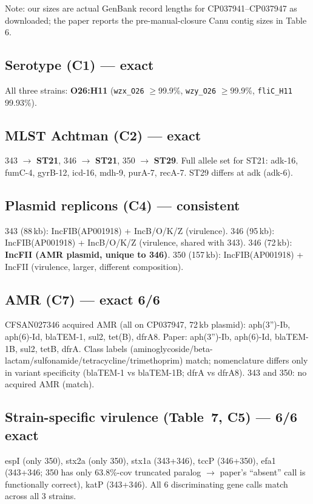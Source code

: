\documentclass[11pt,letterpaper]{article}
\begin{document}
Note: our sizes are actual GenBank record lengths for CP037941--CP037947 as
downloaded; the paper reports the pre-manual-closure Canu contig sizes in Table 6.

\subsection{Serotype (C1) --- exact}
All three strains: \textbf{O26:H11} (\texttt{wzx\_O26} $\geq$99.9\%, \texttt{wzy\_O26}
$\geq$99.9\%, \texttt{fliC\_H11} 99.93\%).

\subsection{MLST Achtman (C2) --- exact}
343 $\to$ \textbf{ST21}, 346 $\to$ \textbf{ST21}, 350 $\to$ \textbf{ST29}.
Full allele set for ST21: adk-16, fumC-4, gyrB-12, icd-16, mdh-9, purA-7, recA-7.
ST29 differs at adk (adk-6).

\subsection{Plasmid replicons (C4) --- consistent}
343 (88\,kb): IncFIB(AP001918) + IncB/O/K/Z (virulence). 346 (95\,kb):
IncFIB(AP001918) + IncB/O/K/Z (virulence, shared with 343). 346 (72\,kb):
\textbf{IncFII (AMR plasmid, unique to 346)}. 350 (157\,kb): IncFIB(AP001918) +
IncFII (virulence, larger, different composition).

\subsection{AMR (C7) --- exact 6/6}
CFSAN027346 acquired AMR (all on CP037947, 72\,kb plasmid): aph(3'')-Ib, aph(6)-Id,
blaTEM-1, sul2, tet(B), dfrA8. Paper: aph(3'')-Ib, aph(6)-Id, blaTEM-1B, sul2, tetB,
dfrA. Class labels (aminoglycoside/beta-lactam/sulfonamide/tetracycline/trimethoprim)
match; nomenclature differs only in variant specificity (blaTEM-1 vs blaTEM-1B; dfrA vs
dfrA8). 343 and 350: no acquired AMR (match).

\subsection{Strain-specific virulence (Table~7, C5) --- 6/6 exact}
espI (only 350), stx2a (only 350), stx1a (343+346), tccP (346+350), efa1 (343+346;
350 has only 63.8\%-cov truncated paralog $\to$ paper's ``absent'' call is
functionally correct), katP (343+346). All 6 discriminating gene calls match across
all 3 strains.
\end{document}
